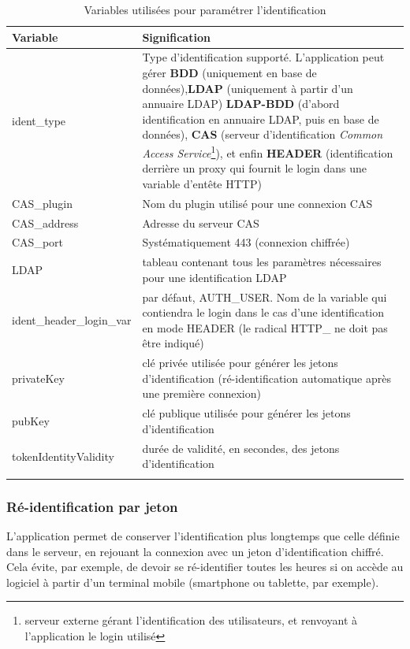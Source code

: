 \begin{longtable}{|p{4cm}|p{11cm}|}
\hline
\textbf{Variable} & \textbf{Signification} \\
\hline
\endhead
ident\_type & Type d'identification supporté. L'application peut gérer \textbf{BDD} (uniquement en base de données),\textbf{LDAP} (uniquement à partir d'un annuaire LDAP) \textbf{LDAP-BDD} (d'abord identification en annuaire LDAP, puis en base de données), \textbf{CAS} (serveur d'identification \textit{Common Access Service}\footnote{serveur externe gérant l'identification des utilisateurs, et renvoyant à l'application le login utilisé}), et enfin \textbf{HEADER} (identification derrière un proxy qui fournit le login dans une variable d'entête HTTP)\\
\hline
CAS\_plugin & Nom du plugin utilisé pour une connexion CAS \\
\hline
CAS\_address & Adresse du serveur CAS\\
\hline
CAS\_port & Systématiquement 443 (connexion chiffrée)\\
\hline
LDAP & tableau contenant tous les paramètres nécessaires pour une identification LDAP \\
\hline
ident\_header\_login\_var & par défaut, AUTH\_USER. Nom de la variable qui contiendra le login dans le cas d'une identification en mode HEADER (le radical HTTP\_  ne doit pas être indiqué) \\
\hline
privateKey & clé privée utilisée pour générer les jetons d'identification (ré-identification automatique après une première connexion) \\
\hline
pubKey & clé publique utilisée pour générer les jetons d'identification \\
\hline
tokenIdentityValidity & durée de validité, en secondes, des jetons d'identification\\
\hline
\caption{Variables utilisées pour paramétrer l'identification}
\end{longtable}

\subsubsection{Ré-identification par jeton}

L'application permet de conserver l'identification plus longtemps que celle définie dans le serveur, en rejouant la connexion avec un jeton d'identification chiffré. Cela évite, par exemple, de devoir se ré-identifier toutes les heures si on accède au logiciel à partir d'un terminal mobile (smartphone ou tablette, par exemple).

